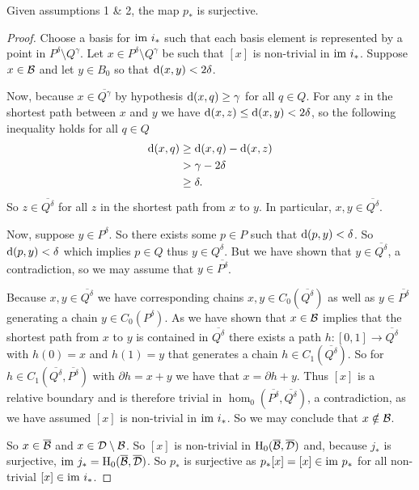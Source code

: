 \begin{lemma}\label{lem:psurj}
    Given assumptions 1 \& 2, the map $p_*$ is surjective.
\end{lemma}
\begin{proof}
  Choose a basis for $\mathrm{im}~i_*$ such that each basis element is represented by a point in $P^\delta\setminus Q^\gamma$.
  Let $x\in P^\delta\setminus Q^\gamma$ be such that $[x]$ is non-trivial in $\mathrm{im}~i_*$.
  Suppose $x\in{\mathcal{B}}$ and let $y\in B_0$ so that $\mathrm{d}(x, y) < 2\delta$.

  Now, because $x\in\overline{Q^\gamma}$ by hypothesis $\mathrm{d}(x, q) \geq \gamma$ for all $q\in Q$.
  For any $z$ in the shortest path between $x$ and $y$ we have $\mathrm{d}(x, z)\leq \mathrm{d}(x, y) < 2\delta$, so the following inequality holds for all $q\in Q$
  \begin{align*}
    \mathrm{d}(x, q) & \geq \mathrm{d}(x, q) - \mathrm{d}(x, z)\\
                & > \gamma - 2\delta\\
                & \geq \delta.
  \end{align*}
  So $z\in \overline{Q^\delta}$ for all $z$ in the shortest path from $x$ to $y$.
  In particular, $x,y\in\overline{Q^\delta}$.

  Now, suppose $y\in P^\delta$.
  So there exists some $p\in P$ such that $\mathrm{d}(p, y) < \delta$.
  So $\mathrm{d}(p, y) < \delta$ which implies $p\in Q$ thus $y\in Q^\delta$.
  But we have shown that $y\in \overline{Q^\delta}$, a contradiction, so we may assume that $y\in \overline{P^\delta}$.

  Because $x,y\in\overline{Q^\delta}$ we have corresponding chains $x,y\in C_0(\overline{Q^\delta})$ as well as $y\in\overline{P^\delta}$ generating a chain $y\in C_0(P^\delta)$.
  As we have shown that $x\in {\mathcal{B}}$ implies that the shortest path from $x$ to $y$ is contained in $\overline{Q^\delta}$ there exists a path $h: [0,1]\to \overline{Q^\delta}$ with $h(0) = x$ and $h(1) = y$ that generates a chain $h\in C_1(\overline{Q^\delta})$.
  So for $h\in C_1(\overline{Q^\delta}, \overline{P^\delta})$ with $\partial h = x + y$ we have that $x = \partial h + y$.
  Thus $[x]$ is a relative boundary and is therefore trivial in $\hom_0(\overline{P^\delta}, \overline{Q^\delta})$, a contradiction, as we have assumed $[x]$ is non-trivial in $\mathrm{im}~i_*$.
  So we may conclude that $x\notin {\mathcal{B}}$.

  So $x\in\overline{{\mathcal{B}}}$ and $x\in {\mathcal{D}}\setminus{\mathcal{B}}$.
  So $[x]$ is non-trivial in $\mathrm{H}_0(\overline{{\mathcal{B}}},\overline{{\mathcal{D}}})$ and, because $j_*$ is surjective, $\mathrm{im}~j_* = \mathrm{H}_0(\overline{{\mathcal{B}}},\overline{{\mathcal{D}}})$.
  So $p_*$ is surjective as $p_*[x] = [x]\in\mathrm{im}~p_*$ for all non-trivial $[x]\in\mathrm{im}~i_*$.
\end{proof}

